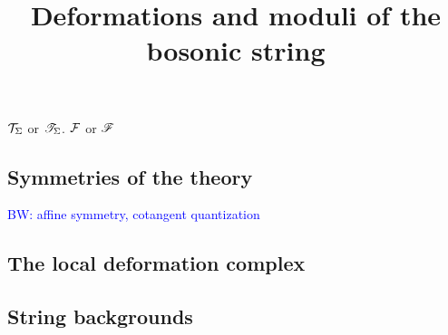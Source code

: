 \documentclass[10pt]{amsart}
\title{Deformations and moduli of the bosonic string}
\def\brian{\textcolor{blue}{BW: }\textcolor{blue}}
\begin{document}
\maketitle

$\mathcal T_\Sigma$ or $\mathscr T_\Sigma$. $\mathcal F$ or $\mathscr F$

\subsection{Symmetries of the theory}

\brian{affine symmetry, cotangent quantization}

\subsection{The local deformation complex}

\subsection{String backgrounds}
\end{document}
